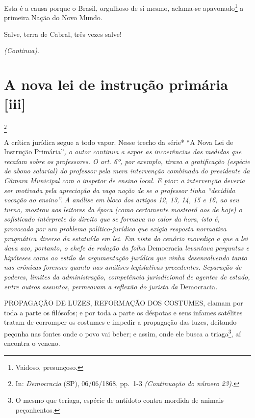 Esta é a causa porque o Brasil, orgulhoso de si mesmo, aclama-se
apavonado\footnote{Vaidoso, presunçoso.} a primeira Nação do Novo
Mundo.

Salve, terra de Cabral, três vezes salve!

\emph{(Continua)}.

\chapter{A nova lei de instrução primária {[}iii{]}}\footnote{In:
  \emph{Democracia} (SP), 06/06/1868, pp.~1-3 \emph{(Continuação do
  número 23).}}

\begin{didascalia}
A crítica jurídica segue a todo vapor. Nesse trecho da série* ``A Nova
Lei de Instrução Primária''\emph{, o autor continua a expor as
incoerências das medidas que recaíam sobre os professores. O art. 6º,
por exemplo, tirava a gratificação (espécie de abono salarial) do
professor pela mera intervenção combinada do presidente da Câmara
Municipal com o inspetor de ensino local. E pior: a intervenção deveria
ser motivada pela apreciação da vaga noção de se o professor tinha
``decidida vocação ao ensino''. A análise em bloco dos artigos 12, 13, 14,
15 e 16, ao seu turno, mostrou aos leitores da época (como certamente
mostrará aos de hoje) o sofisticado intérprete do direito que se formava
no calor da hora, isto é, provocado por um problema político-jurídico
que exigia resposta normativa pragmática diversa da estatuída em lei. Em
vista do cenário movediço a que a lei dava azo, portanto, o chefe de
redação da folha} Democracia \emph{levantava perguntas e hipóteses caras
ao estilo de argumentação jurídica que vinha desenvolvendo tanto nas
crônicas forenses quanto nas análises legislativas precedentes.
Separação de poderes, limites da administração, competência
jurisdicional de agentes de estado, entre outros assuntos, permeavam a
reflexão do jurista da} Democracia\emph{.}
\end{didascalia}

\asterisc{}

PROPAGAÇÃO DE LUZES, REFORMAÇÃO DOS COSTUMES, clamam por toda a parte os
filósofos; e por toda a parte os déspotas e seus infames satélites
tratam de corromper os costumes e impedir a propagação das luzes,
deitando peçonha nas fontes onde o povo vai beber; e assim, onde ele
busca a triaga\footnote{O mesmo que teriaga, espécie de antídoto
  contra mordida de animais peçonhentos.}, aí encontra o veneno.

